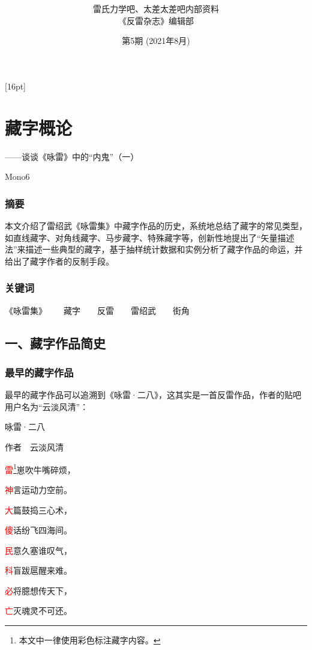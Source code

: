 \documentclass[UTF8,12pt,oneside]{ctexbook}
\title{\textbf{\fontsize{42}{84}{反雷杂志 \\[15] Anti-Lei Magazine}}}
\author{\Large \kaishu 雷氏力学吧、太差太差吧内部资料 \\[8] \Large \kaishu 《反雷杂志》编辑部}
\date{\huge 第5期 (2021年8月)}
\begin{document}
    \large
    
    \setcounter{secnumdepth}{-2} 
    \setcounter{tocdepth}{1}
    [16pt]{\addvspace{2pt}\filright}
    {\contentspush{\thecontentslabel\hspace{0.8em}}}
    {}{\contentspage}

    \tableofcontents

    \chapter{藏字概论}
    \hfill{\Large ——谈谈《咏雷》中的“内鬼”（一）}
    ~\\
    \begin{center}
        Mono6
    \end{center}

    \newcommand{\red}{\textcolor{red}}

    \subsection{摘要}
        本文介绍了雷绍武《咏雷集》中藏字作品的历史，系统地总结了藏字的常见类型，如直线藏字、对角线藏字、马步藏字、特殊藏字等，创新性地提出了“矢量描述法”来描述一些典型的藏字，基于抽样统计数据和实例分析了藏字作品的命运，并给出了藏字作者的反制手段。
    
    \subsection{关键词}
        《咏雷集》\ \ \ \ 藏字\ \ \ \ 反雷\ \ \ \ 雷绍武\ \ \ \ 街角

    \section{一、藏字作品简史}

    \subsection{最早的藏字作品}
        最早的藏字作品可以追溯到《咏雷·二八》，这其实是一首反雷作品，作者的贴吧用户名为“云淡风清”：

        \begin{center}
            \heiti [七律] 咏雷·二八

            \songti 作者\ \ 云淡风清
            
            \kaishu
            \red{雷}\footnote{本文中一律使用彩色标注藏字内容。}崽吹牛嘴碎烦，

            \red{神}言运动力空前。
            
            \red{大}篇鼓捣三心术，
            
            \red{傻}话纷飞四海间。
            
            \red{民}意久塞谁叹气，
            
            \red{科}盲跋扈醒来难。
            
            \red{必}将臆想传天下，
            
            \red{亡}灭魂灵不可还。

        \end{center}
\end{document}
